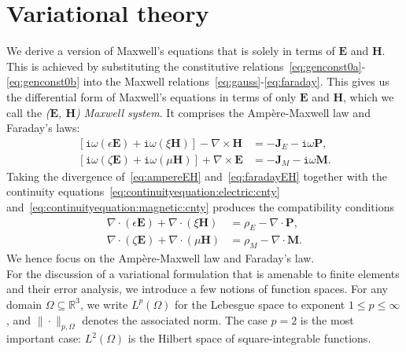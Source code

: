 \documentclass[journal,transmag]{IEEEtran}
\newcommand*\VF[1]{\mathbf{#1}}
\newcommand*\iunit{\mathtt{i}}
\begin{document}
\section{\label{sec:variational} Variational theory}
We derive a version of Maxwell's equations that is solely in terms of $\VF{E}$ and $\VF{H}$.
This is achieved by substituting the constitutive relations~\eqref{eq:genconst0a}-\eqref{eq:genconst0b}
into the Maxwell relations~\eqref{eq:gauss}-\eqref{eq:faraday}.
This gives us the differential form of Maxwell's equations in terms of only $\VF{E}$ and $\VF{H}$, which we call the \emph{($\VF{E}$, $\VF{H}$) Maxwell system}.
It comprises the Amp\`ere-Maxwell law and Faraday's laws:
\begin{align} 
 \label{eq:ampereEH} 
 \left[ \iunit\omega \left( \epsilon \VF{E} \right) + \iunit\omega \left( \xi \VF{H} \right) \right] - \nabla\times\VF{H} &= -\VF{J}_{E} - \iunit\omega \VF{P},
 \\
 \label{eq:faradayEH} 
 \left[ \iunit\omega \left( \zeta \VF{E} \right) + \iunit\omega \left( \mu \VF{H} \right) \right] + \nabla\times\VF{E} &= - \VF{J}_{M} - \iunit\omega \VF{M}.
\end{align} 
Taking the divergence of~\eqref{eq:ampereEH} and~\eqref{eq:faradayEH} 
together with the continuity equations~\eqref{eq:continuityequation:electric:cnty} and~\eqref{eq:continuityequation:magnetic:cnty}
produces the compatibility conditions 
\begin{align} 
 \label{eq:electricgaussEH}
 \nabla \cdot \left(  \epsilon \VF{E} \right) + \nabla \cdot  \left( \xi \VF{H} \right) &= \rho_{E} - \nabla \cdot \VF{P},
 \\
 \label{eq:magneticgaussEH}
 \nabla \cdot \left(  \zeta \VF{E} \right) + \nabla \cdot \left( \mu \VF{H} \right) &= \rho_{M} - \nabla \cdot \VF{M}. 
\end{align} 
We hence focus on the Amp\`ere-Maxwell law and Faraday's law.
\\

For the discussion of a variational formulation that is amenable to finite elements and their error analysis, 
we introduce a few notions of function spaces. 
For any domain $\Omega \subseteq \mathbb{R}^3$,
we write $L^{p}(\Omega)$ for the Lebesgue space to exponent $1 \leq p \leq \infty$,
and $\|\cdot\|_{p,\Omega}$ denotes the associated norm. 
The case $p=2$ is the most important case: $L^{2}(\Omega)$ is the Hilbert space of square-integrable functions.
\end{document}
